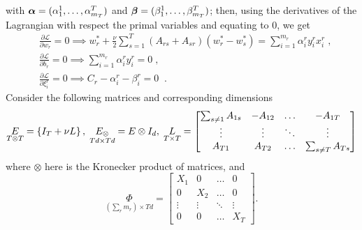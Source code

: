 with $\bm{\alpha} = (\alpha_{1}^1, \ldots, \alpha_{m_T}^T)$ and $\bm{\beta} = (\beta_{1}^1, \ldots, \beta_{m_T}^T)$;
then, using the derivatives of the Lagrangian with respect the primal variables and equating to $0$, we get
\begin{align}
& \frac{\partial \mathcal{L}}{\partial w_r} = 0 \implies  w_r^* + \frac{\nu}{2} \sum_{s=1}^T (A_{rs} + A_{sr}) (w_r^* - w_s^*)= \sum_{i=1}^{m_r}{\alpha_i^r y_i^r x_i^r} \label{eq:partial_w_r_addreg} \; , \\
& \frac{\partial \mathcal{L}}{\partial b_r} = 0 \implies  \sum_{i=1}^{m_r}{\alpha_i^r y_i^r } = 0 \label{eq:partial_b_r_addreg} \; ,\\
& \frac{\partial \mathcal{L}}{\partial \xi_i^r} = 0 \implies C_r - \alpha_i^r - \beta_i^r = 0 \; \label{eq:partial_xi_addreg}\; .
\end{align}
Consider 
the following matrices and corresponding dimensions
\begin{equation*}
    \underset{T \otimes T}{E} = \left\lbrace I_T + \nu L \right\rbrace, \;
    \underset{T d \times T d}{E_\otimes} = E \otimes I_d, \;
    \underset{T \times T}{L} =
    \begin{bmatrix}
        \sum_{s \neq 1} A_{1s} & - A_{12} & \ldots & - A_{1T} \\
        \vdots & \vdots & \ddots & \vdots \\
        A_{T 1} & A_{T 2} & \ldots & \sum_{s \neq T} A_{T s}
    \end{bmatrix}
\end{equation*}
where $\otimes$ here is the Kronecker product of matrices,
and
\begin{equation*}
    \underset{(\sum_r m_r) \times Td}{\Phi} =
    \begin{bmatrix}
        X_1 & 0 & \ldots & 0 \\
        0 & X_2 & \ldots & 0 \\
        \vdots & \vdots & \ddots & \vdots \\
        0 & 0 & \ldots & X_T
    \end{bmatrix} .
\end{equation*}
